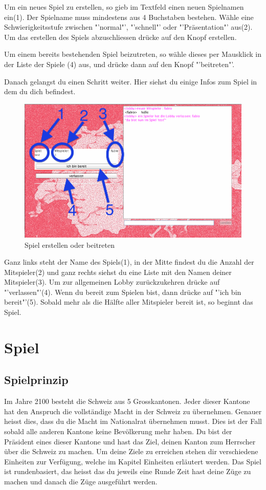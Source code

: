 \documentclass[ngerman, 12pt, pdftex]{scrartcl}[2006/07/30]
\begin{document}
Um ein neues Spiel zu erstellen, so gieb im Textfeld einen neuen Spielnamen ein(1).
Der Spielname muss mindestens aus 4 Buchstaben bestehen.
W\"{a}hle eine Schwierigkeitsstufe zwischen "'normal"', "'schnell"' oder "'Präsentation"' aus(2).
Um das erstellen des Spiels abzuschliessen dr\"{u}cke auf den Knopf erstellen.

Um einem bereits bestehenden Spiel beizutreten, so w\"{a}hle dieses per Mausklick in der Liste der Spiele (4) aus, und dr\"{u}cke dann auf den Knopf "'beitreten"'.

Danach gelangst du einen Schritt weiter. Hier siehst du einige Infos zum Spiel in dem du dich befindest.

\begin{figure}[h]
\centering
\includegraphics[scale=0.3]{lobby/spielinfos.png}
\caption{Spiel erstellen oder beitreten}
\end{figure}

 Ganz links steht der Name des Spiels(1), in der Mitte findest du die Anzahl der Mitspieler(2) und ganz rechts siehst du eine Liste mit den Namen deiner Mitspieler(3).
Um zur allgemeinen Lobby zur\"{u}ckzukehren dr\"{u}cke auf "'verlassen"'(4).
Wenn du bereit zum Spielen bist, dann dr\"{u}cke auf "'ich bin bereit"'(5). Sobald mehr als die Hälfte aller Mitspieler bereit ist, so beginnt das Spiel.

\newpage

\section{Spiel}
\subsection{Spielprinzip}
Im Jahre 2100 besteht die Schweiz aus 5 Grosskantonen. Jeder dieser Kantone hat den Anspruch die vollständige Macht in der Schweiz zu übernehmen.
Genauer heisst dies, dass du die Macht im Nationalrat übernehmen musst. Dies ist der Fall sobald alle anderen Kantone keine Bevölkerung mehr haben.
Du bist der Präsident eines dieser Kantone und hast das Ziel, deinen Kanton zum Herrscher über die Schweiz zu machen. 
Um deine Ziele zu erreichen stehen dir verschiedene Einheiten zur Verfügung, welche im Kapitel Einheiten erläutert werden.
Das Spiel ist rundenbasiert, das heisst das du jeweils eine Runde Zeit hast deine Züge zu machen und danach die Züge ausgeführt werden.
\end{document}
